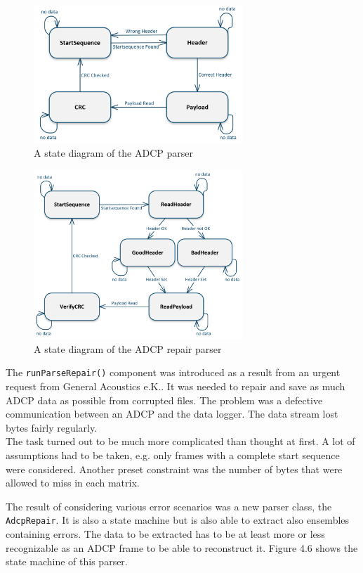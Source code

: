 \begin{figure}[ht]
\centering
      \includegraphics[width=0.7\textwidth]{parser}
        \caption{A state diagram of the ADCP parser}
\end{figure}
\begin{figure}[!hb]
\centering
      \includegraphics[width=0.7\textwidth]{repair}
        \caption{A state diagram of the ADCP repair parser}
\end{figure}
\pagebreak
The \texttt{runParseRepair()} component was introduced as a result from an urgent request from General Acoustics e.K.. It was needed to repair and save as much ADCP data as possible from corrupted files. The problem was a defective communication between an ADCP and the data logger. The data stream lost bytes fairly regularly.\\
The task turned out to be much more complicated than thought at first. A lot of assumptions had to be taken, e.g. only frames with a complete start sequence were considered. Another preset constraint was the number of bytes that were allowed to miss in each matrix. 

The result of considering various error scenarios was a new parser class, the \texttt{AdcpRepair}. It is also a state machine but is also able to extract also ensembles containing errors. The data to be extracted has to be at least more or less recognizable as an ADCP frame to be able to reconstruct it. Figure 4.6 shows the state machine of this parser.

